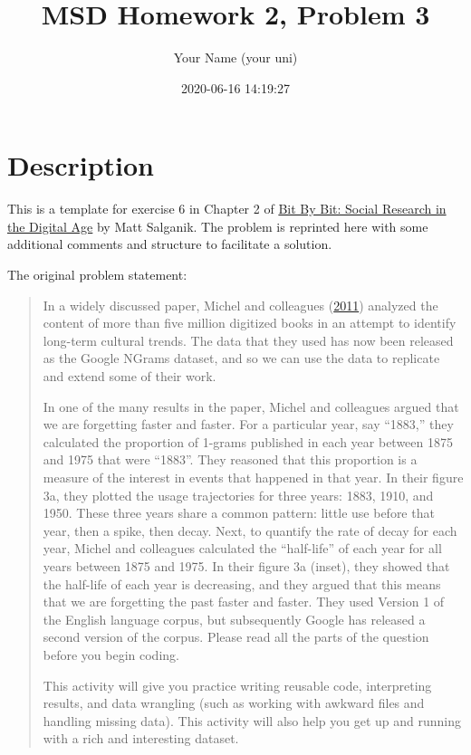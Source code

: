 \documentclass[
]{article}
\title{MSD Homework 2, Problem 3}
\author{Your Name (your uni)}
\date{2020-06-16 14:19:27}
\begin{document}
\maketitle

{
\setcounter{tocdepth}{3}
\tableofcontents
}
\hypertarget{description}{%
\section{Description}\label{description}}

This is a template for exercise 6 in Chapter 2 of
\href{https://www.bitbybitbook.com/en/1st-ed/observing-behavior/observing-activities/}{Bit
By Bit: Social Research in the Digital Age} by Matt Salganik. The
problem is reprinted here with some additional comments and structure to
facilitate a solution.

The original problem statement:

\begin{quote}
In a widely discussed paper, Michel and colleagues
(\href{https://doi.org/10.1126/science.1199644}{2011}) analyzed the
content of more than five million digitized books in an attempt to
identify long-term cultural trends. The data that they used has now been
released as the Google NGrams dataset, and so we can use the data to
replicate and extend some of their work.

In one of the many results in the paper, Michel and colleagues argued
that we are forgetting faster and faster. For a particular year, say
``1883,'' they calculated the proportion of 1-grams published in each
year between 1875 and 1975 that were ``1883''. They reasoned that this
proportion is a measure of the interest in events that happened in that
year. In their figure 3a, they plotted the usage trajectories for three
years: 1883, 1910, and 1950. These three years share a common pattern:
little use before that year, then a spike, then decay. Next, to quantify
the rate of decay for each year, Michel and colleagues calculated the
``half-life'' of each year for all years between 1875 and 1975. In their
figure 3a (inset), they showed that the half-life of each year is
decreasing, and they argued that this means that we are forgetting the
past faster and faster. They used Version 1 of the English language
corpus, but subsequently Google has released a second version of the
corpus. Please read all the parts of the question before you begin
coding.

This activity will give you practice writing reusable code, interpreting
results, and data wrangling (such as working with awkward files and
handling missing data). This activity will also help you get up and
running with a rich and interesting dataset.
\end{quote}
\end{document}
